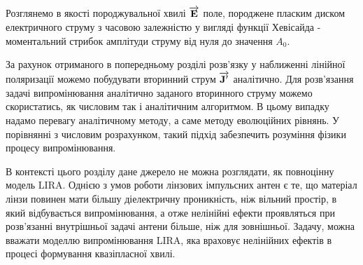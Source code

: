 Розглянемо в якості породжувальної хвилі $ \overrightarrow{\mathbf E} $ поле, породжене 
пласким диском електричного струму з часовою залежністю у вигляді 
функції Хевісайда - моментальний стрибок амплітуди струму від нуля до 
значення $ A_0 $.

За рахунок отриманого в попередньому розділі розв'язку у наближенні 
лінійної поляризації можемо побудувати вторинний струм $ \overrightarrow{\mathbf J^\prime} $
аналітично. Для розв'язання задачі випромінювання аналітично заданого 
вторинного струму можемо скористатись, як числовим так і аналітичним 
алгоритмом. В цьому випадку надамо перевагу аналітичному методу, а саме 
методу еволюційних рівнянь. У порівнянні з числовим розрахунком, такий підхід
забезпечить розуміння фізики процесу випромінювання.

В контексті цього розділу дане джерело не можна розглядати, як повноцінну 
модель LIRA. Однією з умов роботи лінзових імпульсних антен є те, що матеріал 
лінзи повинен мати більшу діелектричну проникність, ніж вільний простір, в який 
відбувається випромінювання, а отже нелінійні ефекти проявляться при 
розв'язанні внутрішньої задачі антени більше, ніж для зовнішньої. Задачу,
можна вважати моделлю випромінювання LIRA, яка враховує нелінійних ефектів 
в процесі формування квазіпласної хвилі.

